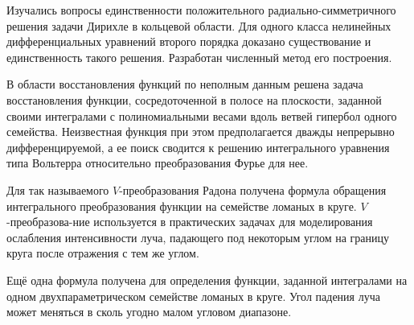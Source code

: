 Изучались вопросы 
единственности положительного радиально-симметричного решения задачи Дирихле в кольцевой
области. 
Для одного класса нелинейных дифференциальных уравнений второго порядка доказано существование и единственность такого решения. 
Разработан численный метод его построения.










В области восстановления функций по неполным данным решена задача восстановления функции, сосредоточенной в полосе на плоскости, заданной своими интегралами с полиномиальными весами вдоль ветвей гипербол одного семейства. Неизвестная функция при этом предполагается дважды непрерывно дифференцируемой, а ее поиск сводится к решению интегрального уравнения типа Вольтерра относительно преобразования Фурье для нее.

Для так называемого $V$-преобразования Радона получена формула обращения интегрального преобразования функции на семействе ломаных в круге. $V$-преобразова-\linebreak ние используется в практических задачах для моделирования ослабления интенсивности луча, падающего под некоторым углом на границу круга после отражения с тем же углом.

Ещё одна формула получена для определения функции, заданной интегралами на одном двухпараметрическом семействе ломаных в круге.  Угол падения луча может меняться в сколь угодно малом угловом диапазоне.












%
%

